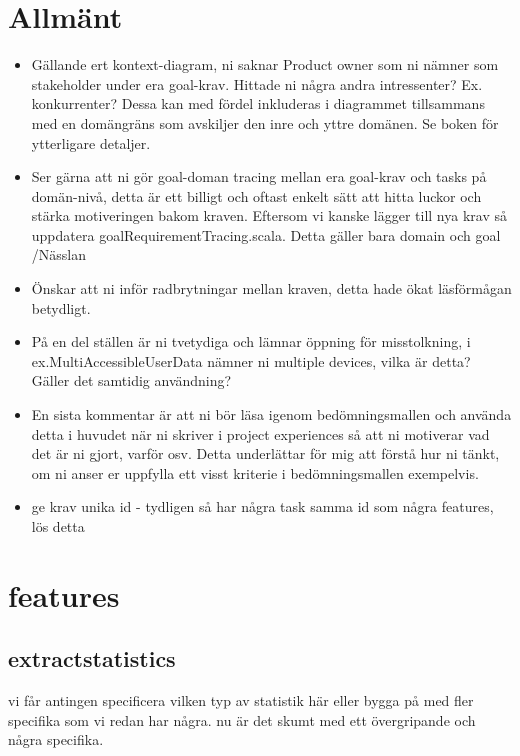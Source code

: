 \documentclass[a4paper]{article}
\begin{document}
	\thispagestyle{empty}
	\setcounter{page}{0}
	\pagebreak
	\tableofcontents
	\pagebreak

\section{Allmänt}
\begin{itemize}

	
	\item Gällande ert kontext-diagram, ni saknar Product owner som ni nämner som stakeholder under era goal-krav. Hittade ni några andra intressenter? Ex. konkurrenter? Dessa kan med fördel inkluderas i diagrammet tillsammans med en domängräns som avskiljer den inre och yttre domänen. Se boken för ytterligare detaljer.
	
	\item Ser gärna att ni gör goal-doman tracing mellan era goal-krav och tasks på domän-nivå, detta är ett billigt och oftast enkelt sätt att hitta luckor och stärka motiveringen bakom kraven. Eftersom vi kanske lägger till nya krav så uppdatera goalRequirementTracing.scala. Detta gäller bara domain och goal /Nässlan
	
	\item Önskar att ni inför radbrytningar mellan kraven, detta hade ökat läsförmågan betydligt.
	

	\item På en del ställen är ni tvetydiga och lämnar öppning för misstolkning, i ex.MultiAccessibleUserData nämner ni multiple devices, vilka är detta? Gäller det samtidig användning?
	
	
	\item En sista kommentar är att ni bör läsa igenom bedömningsmallen och använda detta i huvudet när ni skriver i project experiences så att ni motiverar vad det är ni gjort, varför osv. Detta underlättar för mig att förstå hur ni tänkt, om ni anser er uppfylla ett visst kriterie i bedömningsmallen exempelvis.
	
	
	\item ge krav unika id - tydligen så har några task samma id som några features, lös detta
	
\end{itemize}


\section{features}

		
	\subsection{extractstatistics}
vi får antingen specificera vilken typ av statistik  här eller bygga på med  fler specifika som vi redan har några. nu är det skumt med ett övergripande och några specifika.
	
\end{document}
